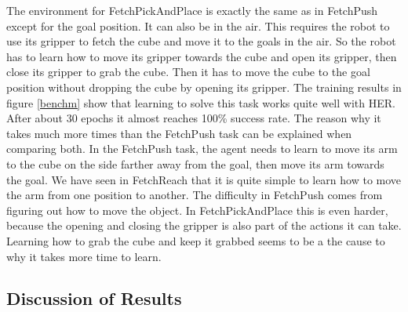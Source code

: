 The environment for FetchPickAndPlace is exactly the same as in FetchPush except for the goal position. It can also be in the air. This requires the robot to use its gripper to fetch the cube and move it to the goals in the air. So the robot has to learn how to move its gripper towards the cube and open its gripper, then close its gripper to grab the cube. Then it has to move the cube to the goal position without dropping the cube by opening its gripper. 
The training results in figure \ref{benchm} show that learning to solve this task works quite well with HER. After about 30 epochs it almost reaches 100\% success rate. 
The reason why it takes much more times than the FetchPush task can be explained when comparing both. In the FetchPush task, the agent needs to learn to move its arm to the cube on the side farther away from the goal, then move its arm towards the goal. We have seen in FetchReach that it is quite simple to learn how to move the arm from one position to another. The difficulty in FetchPush comes from figuring out how to move the object. In FetchPickAndPlace this is even harder, because the opening and closing the gripper is also part of the actions it can take. Learning how to grab the cube and keep it grabbed seems to be a the cause to why it takes more time to learn. 


\subsection{Discussion of Results}

